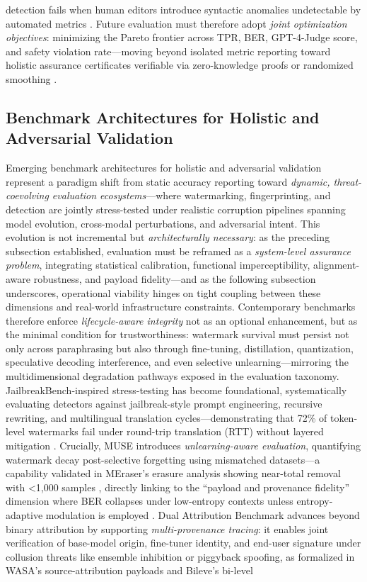 \documentclass[11pt,a4paper]{article}
\begin{document}
detection \cite{arxiv:2306.09194} fails when human editors introduce syntactic anomalies undetectable by automated metrics \cite{arxiv:2303.13408}. Future evaluation must therefore adopt \emph{joint optimization objectives}: minimizing the Pareto frontier across TPR, BER, GPT-4-Judge score, and safety violation rate---moving beyond isolated metric reporting toward holistic assurance certificates verifiable via zero-knowledge proofs \cite{doi:10.1007/s44443-025-00177-1} or randomized smoothing \cite{arxiv:2403.04808}.


\subsection{Benchmark Architectures for Holistic and Adversarial Validation}


Emerging benchmark architectures for holistic and adversarial validation represent a paradigm shift from static accuracy reporting toward \emph{dynamic, threat-coevolving evaluation ecosystems}---where watermarking, fingerprinting, and detection are jointly stress-tested under realistic corruption pipelines spanning model evolution, cross-modal perturbations, and adversarial intent. This evolution is not incremental but \emph{architecturally necessary}: as the preceding subsection established, evaluation must be reframed as a \emph{system-level assurance problem}, integrating statistical calibration, functional imperceptibility, alignment-aware robustness, and payload fidelity---and as the following subsection underscores, operational viability hinges on tight coupling between these dimensions and real-world infrastructure constraints. Contemporary benchmarks therefore enforce \emph{lifecycle-aware integrity} not as an optional enhancement, but as the minimal condition for trustworthiness: watermark survival must persist not only across paraphrasing but also through fine-tuning, distillation, quantization, speculative decoding interference, and even selective unlearning---mirroring the multidimensional degradation pathways exposed in the evaluation taxonomy. JailbreakBench-inspired stress-testing has become foundational, systematically evaluating detectors against jailbreak-style prompt engineering, recursive rewriting, and multilingual translation cycles---demonstrating that 72\% of token-level watermarks fail under round-trip translation (RTT) without layered mitigation \cite{arxiv:2601.11629}. Crucially, MUSE introduces \emph{unlearning-aware evaluation}, quantifying watermark decay post-selective forgetting using mismatched datasets---a capability validated in MEraser's erasure analysis showing near-total removal with <1,000 samples \cite{doi:10.1145/3639477.3639720}, directly linking to the ``payload and provenance fidelity'' dimension where BER collapses under low-entropy contexts unless entropy-adaptive modulation is employed \cite{arxiv:2406.01946,arxiv:2402.16187,arxiv:2403.04808}. Dual Attribution Benchmark advances beyond binary attribution by supporting \emph{multi-provenance tracing}: it enables joint verification of base-model origin, fine-tuner identity, and end-user signature under collusion threats like ensemble inhibition or piggyback spoofing, as formalized in WASA's source-attribution payloads and Bileve's bi-level 
\end{document}
